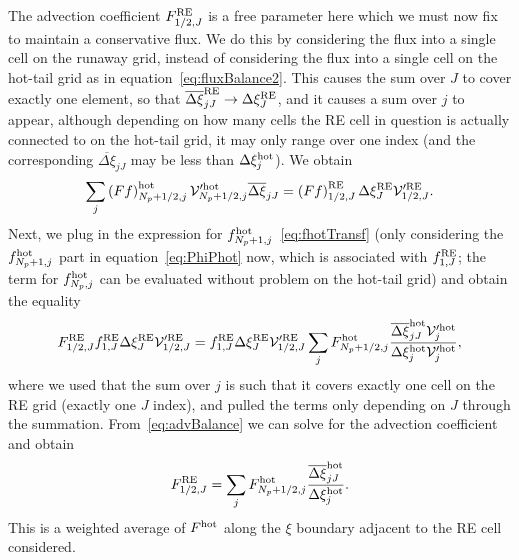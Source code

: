 \documentclass{notes}
\newcommand{\Vp}{\mathcal{V}'}
\begin{document}
    The advection coefficient $F^{\rm RE}_{1/2,J}$ is a free parameter here
    which we must now fix to maintain a conservative flux. We do this by
    considering the flux into a single cell on the runaway grid, instead of
    considering the flux into a single cell on the hot-tail grid as in
    equation~\eqref{eq:fluxBalance2}. This causes the sum over $J$ to cover
    exactly one element, so that $\overline{\Delta\xi}_{jJ}^{\rm RE}\to\Delta\xi_J^{\rm RE}$,
    and it causes a sum over $j$ to appear, although depending on how many cells
    the RE cell in question is actually connected to on the hot-tail grid, it
    may only range over one index (and the corresponding
    $\overline{\Delta\xi}_{jJ}$ may be less than $\Delta\xi^{\rm hot}_j$). We
    obtain
    \begin{equation}
        \sum_j \left( Ff \right)^{\rm hot}_{N_p+1/2,j} \Vp^{\rm hot}_{N_p+1/2,j} \overline{\Delta\xi}_{jJ} =
        \left( F f \right)^{\rm RE}_{1/2,J} \Delta\xi^{\rm RE}_J\Vp^{\rm RE}_{1/2,J}.
    \end{equation}
    Next, we plug in the expression for
    $f^{\rm hot}_{N_p+1,j}$~\eqref{eq:fhotTransf} (only considering the
    $f^{\rm hot}_{N_p+1,j}$ part in equation~\eqref{eq:PhiPhot} now, which is
    associated with $f^{\rm RE}_{1,J}$; the term for $f^{\rm hot}_{N_p,j}$ can be
    evaluated without problem on the hot-tail grid) and obtain the equality
    \begin{equation}\label{eq:advBalance}
        F^{\rm RE}_{1/2,J} f^{\rm RE}_{1,J} \Delta\xi^{\rm RE}_J\Vp^{\rm RE}_{1/2,J} =
        f_{1,J}^{\rm RE}\Delta\xi^{\rm RE}_J\Vp^{\rm RE}_{1/2,J}
        \sum_j F^{\rm hot}_{N_p+1/2,j} \frac{\overline{\Delta\xi}^{\rm hot}_{jJ}\Vp^{\rm hot}_j}
        {\Delta\xi^{\rm hot}_j\Vp^{\rm hot}_j},
    \end{equation}
    where we used that the sum over $j$ is such that it covers exactly one
    cell on the RE grid (exactly one $J$ index), and pulled the terms only
    depending on $J$ through the summation. From~\eqref{eq:advBalance} we can
    solve for the advection coefficient and obtain
    \begin{equation}\label{eq:avAdvection}
        F_{1/2,J}^{\rm RE} = \sum_j F^{\rm hot}_{N_p+1/2,j}
        \frac{\overline{\Delta\xi}^{\rm hot}_{jJ}}{\Delta\xi_j^{\rm hot}}.
    \end{equation}
    This is a weighted average of $F^{\rm hot}$ along the $\xi$ boundary
    adjacent to the RE cell considered.
\end{document}
